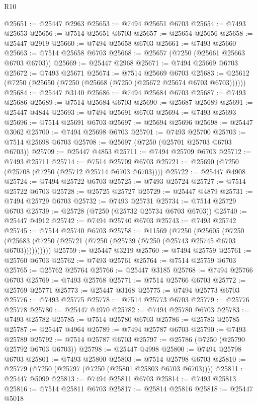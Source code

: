 \begin{lexlean}{R10}
\begin{coremodule}
@25651 := @25447 @2963
@25653 := @7494 @25651 @6703
@25654 := @7493 @25653
@25656 := @7514 @25651 @6703
@25657 := @25654 @25656
@25658 := @25447 @2919
@25660 := @7494 @25658 @6703
@25661 := @7493 @25660
@25663 := @7514 @25658 @6703
@25668 := @25657 (@7250 (@25661 @25663 @6703 @6703))
@25669 := @25447 @2968
@25671 := @7494 @25669 @6703
@25672 := @7493 @25671
@25674 := @7514 @25669 @6703
@25683 := @25612 (@7250 (@25650 (@7250 (@25668 (@7250 (@25672 @25674 @6703 @6703))))))
@25684 := @25447 @3140
@25686 := @7494 @25684 @6703
@25687 := @7493 @25686
@25689 := @7514 @25684 @6703
@25690 := @25687 @25689
@25691 := @25447 @4844
@25693 := @7494 @25691 @6703
@25694 := @7493 @25693
@25696 := @7514 @25691 @6703
@25697 := @25694 @25696
@25698 := @25447 @3062
@25700 := @7494 @25698 @6703
@25701 := @7493 @25700
@25703 := @7514 @25698 @6703
@25708 := @25697 (@7250 (@25701 @25703 @6703 @6703))
@25709 := @25447 @4853
@25711 := @7494 @25709 @6703
@25712 := @7493 @25711
@25714 := @7514 @25709 @6703
@25721 := @25690 (@7250 (@25708 (@7250 (@25712 @25714 @6703 @6703))))
@25722 := @25447 @4908
@25724 := @7494 @25722 @6703
@25725 := @7493 @25724
@25727 := @7514 @25722 @6703
@25728 := @25725 @25727
@25729 := @25447 @4879
@25731 := @7494 @25729 @6703
@25732 := @7493 @25731
@25734 := @7514 @25729 @6703
@25739 := @25728 (@7250 (@25732 @25734 @6703 @6703))
@25740 := @25447 @4912
@25742 := @7494 @25740 @6703
@25743 := @7493 @25742
@25745 := @7514 @25740 @6703
@25758 := @11569
    (@7250
      (@25605
        (@7250 (@25683 (@7250 (@25721 (@7250 (@25739 (@7250 (@25743 @25745 @6703 @6703))))))))))
@25759 := @25447 @3219
@25760 := @7494 @25759
@25761 := @25760 @6703
@25762 := @7493 @25761
@25764 := @7514 @25759 @6703
@25765 := @25762 @25764
@25766 := @25447 @3185
@25768 := @7494 @25766 @6703
@25769 := @7493 @25768
@25771 := @7514 @25766 @6703
@25772 := @25769 @25771
@25773 := @25447 @3168
@25775 := @7494 @25773 @6703
@25776 := @7493 @25775
@25778 := @7514 @25773 @6703
@25779 := @25776 @25778
@25780 := @25447 @4970
@25782 := @7494 @25780 @6703
@25783 := @7493 @25782
@25785 := @7514 @25780 @6703
@25786 := @25783 @25785
@25787 := @25447 @4964
@25789 := @7494 @25787 @6703
@25790 := @7493 @25789
@25792 := @7514 @25787 @6703
@25797 := @25786 (@7250 (@25790 @25792 @6703 @6703))
@25798 := @25447 @4998
@25800 := @7494 @25798 @6703
@25801 := @7493 @25800
@25803 := @7514 @25798 @6703
@25810 := @25779 (@7250 (@25797 (@7250 (@25801 @25803 @6703 @6703))))
@25811 := @25447 @5099
@25813 := @7494 @25811 @6703
@25814 := @7493 @25813
@25816 := @7514 @25811 @6703
@25817 := @25814 @25816
@25818 := @25447 @5018

\end{coremodule}
\end{lexlean}
